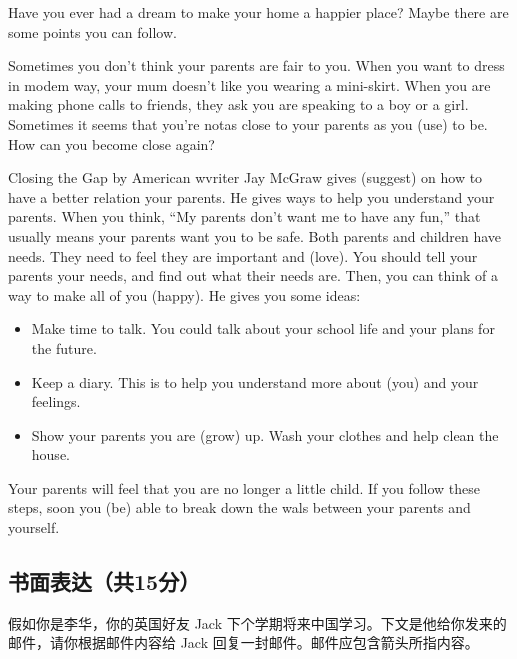 \documentclass{ExamJHSEngl}
\begin{document}
\begin{spacing}{1.5}

Have you ever had a dream to make your home a happier place? Maybe there are some points you can follow.

Sometimes you don't think your parents are fair to you. When you want to dress in  modem way, your mum doesn't like you wearing a mini-skirt. When you are making phone calls to friends, they ask  you are speaking to a boy or a girl. Sometimes it seems that you're notas close to your parents as you  (use) to be. How can you become close again?

Closing the Gap by American wvriter Jay McGraw gives  (suggest) on how to have a better relation  your parents. He gives ways to help you understand your parents. When you think, “My parents don't want me to have any fun,” that usually means your parents want you to be safe. Both parents and children have needs. They need to feel they are important and  (love). You should tell your parents your needs, and find out what their needs are. Then, you can think of a way to make all of you  (happy). He gives you some ideas:

\begin{itemize}
  \item Make time to talk. You could talk about your school life and your plans for the future.
  \item Keep a diary. This is to help you understand more about  (you) and your feelings.
  \item Show your parents you are  (grow) up. Wash your clothes and help clean the house.
\end{itemize}

Your parents will feel that you are no longer a little child. If you follow these steps, soon you  (be) able to break down the wals between your parents and yourself.

\end{spacing}



\subsection{书面表达（共15分）}

假如你是李华，你的英国好友 Jack 下个学期将来中国学习。下文是他给你发来的邮件，请你根据邮件内容给 Jack 回复一封邮件。邮件应包含箭头所指内容。
\end{document}
